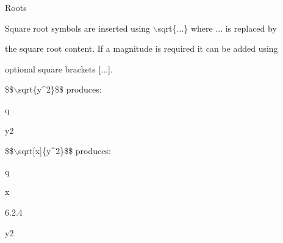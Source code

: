 \documentclass[a4paper,portrait,12pt]{article}
\begin{document}
\begin{flushleft}
Roots
\end{flushleft}





\begin{flushleft}
Square root symbols are inserted using \ensuremath{\backslash}sqrt\{...\} where ... is replaced by
\end{flushleft}


\begin{flushleft}
the square root content. If a magnitude is required it can be added using
\end{flushleft}


\begin{flushleft}
optional square brackets [...].
\end{flushleft}


\begin{flushleft}
\$\$\ensuremath{\backslash}sqrt\{y\^{}2\}\$\$ produces:
\end{flushleft}


\begin{flushleft}
q
\end{flushleft}





\begin{flushleft}
y2
\end{flushleft}





\begin{flushleft}
\$\$\ensuremath{\backslash}sqrt[x]\{y\^{}2\}\$\$ produces:
\end{flushleft}


\begin{flushleft}
q
\end{flushleft}


\begin{flushleft}
x
\end{flushleft}





6.2.4





\begin{flushleft}
y2
\end{flushleft}
\end{document}
